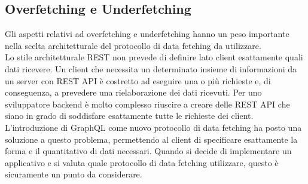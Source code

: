 \subsection{Overfetching e Underfetching}
Gli aspetti relativi ad overfetching e underfetching hanno un peso importante nella scelta architetturale del protocollo di data fetching da utilizzare.\\
Lo stile architetturale REST non prevede di definire lato client esattamente quali dati ricevere. Un client che necessita un determinato insieme di informazioni da un server con REST API è costretto ad eseguire una o più richieste e, di conseguenza, a prevedere una rielaborazione dei dati ricevuti. Per uno sviluppatore backend è molto complesso riuscire a creare delle REST API che siano in grado di soddisfare esattamente tutte le richieste dei client.\\
L'introduzione di GraphQL come nuovo protocollo di data fetching ha posto una soluzione a questo problema, permettendo al client di specificare esattamente la forma e il quantitativo di dati necessari. Quando si decide di implementare un applicativo e si valuta quale protocollo di data fetching utilizzare, questo è sicuramente un punto da considerare.

